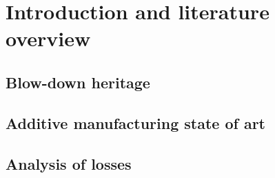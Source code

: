 \section{Introduction and literature overview}
\label{sec:introduction}

\subsection{Blow-down heritage}
\label{subsec:blowdown_intro}

\subsection{Additive manufacturing state of art}
\label{subsec:additive_intro}

\subsection{Analysis of losses}
\label{subsec:losses_intro}